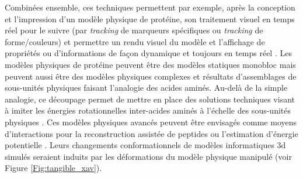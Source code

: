 Combinées ensemble, ces techniques permettent par exemple, après la conception et l'impression d'un modèle physique de protéine, son traitement visuel en temps réel pour le suivre (par \textit{tracking} de marqueurs spécifiques ou \textit{tracking} de forme/couleurs) et permettre un rendu visuel du modèle et l'affichage de propriétés ou d'informations de façon dynamique et toujours en temps réel \cite{gillet2005tangible}. 
Les modèles physiques de protéine peuvent être des modèles statiques monobloc mais peuvent aussi être des modèles physiques complexes et résultats d'assemblages de sous-unités physiques faisant l'analogie des acides aminés. Au-delà de la simple analogie, ce découpage permet de mettre en place des solutions techniques visant à imiter les énergies rotationnelles inter-acides aminés à l'échelle des sous-unités physiques \cite{chakraborty2013coarse}. Ces modèles physiques avancés peuvent être envisagés comme moyens d'interactions pour la reconstruction assistée de peptides ou l'estimation d'énergie potentielle \cite{martinez2015virtual}. Leurs changements conformationnels de modèles informatiques 3d simulés seraient induits par les déformations du modèle physique manipulé (voir Figure \ref{Fig:tangible_xav}).

